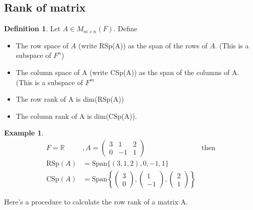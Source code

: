 \documentclass{report}
\theoremstyle{remark}
\theoremstyle{definition}
\newtheorem{definition}[theorem]{Definition}
\theoremstyle{definition}
\newtheorem{example}[theorem]{Example}
\theoremstyle{theorem}
\begin{document}
\subsection{Rank of matrix}
\begin{definition}
Let $A \in M_{m \times n}(F)$. Define
\begin{itemize}
    \item The row space of $A$ (write RSp(A)) as the span of the rows of $A$. (This is a subspace of $F^n$)
    \item The column space of A (write CSp(A)) as the span of the columns of A. (This is a subspace of $F^m$
    \item The row rank of A is dim(RSp(A))
    \item The column rank of A is dim(CSp(A)).
\end{itemize}
\end{definition}
\begin{example}
\begin{align*}
    F = \mathbb{R} &, A = \begin{pmatrix}3&1&2\\0&-1&1\end{pmatrix} & \text{then}\\
    \text{RSp}(A) &= \text{Span}\{(3,1,2),0,-1,1\} \\
    \text{CSp}(A) &= \text{Span}\left\{\begin{pmatrix}3\\0\end{pmatrix}, \begin{pmatrix}1\\-1\end{pmatrix}, \begin{pmatrix}2\\1\end{pmatrix}\right\}
\end{align*}
\end{example}
Here's a procedure to calculate the row rank of a matrix A.
\end{document}
